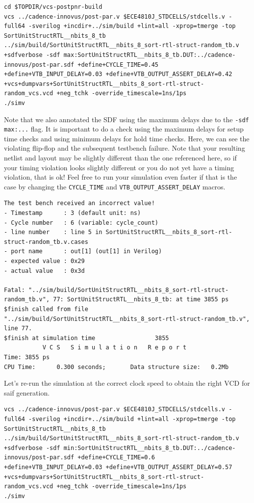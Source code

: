 \documentclass[a4paper,12pt,twoside]{article}
\begin{document}
\begin{verbatim}
cd $TOPDIR/vcs-postpnr-build
vcs ../cadence-innovus/post-par.v $ECE4810J_STDCELLS/stdcells.v -full64 -sverilog +incdir+../sim/build +lint=all -xprop=tmerge -top SortUnitStructRTL__nbits_8_tb ../sim/build/SortUnitStructRTL__nbits_8_sort-rtl-struct-random_tb.v +sdfverbose -sdf max:SortUnitStructRTL__nbits_8_tb.DUT:../cadence-innovus/post-par.sdf +define+CYCLE_TIME=0.45 +define+VTB_INPUT_DELAY=0.03 +define+VTB_OUTPUT_ASSERT_DELAY=0.42 +vcs+dumpvars+SortUnitStructRTL__nbits_8_sort-rtl-struct-random_vcs.vcd +neg_tchk -override_timescale=1ns/1ps
./simv
\end{verbatim}
Note that we also annotated the SDF using the maximum delays due to the \texttt{-sdf max:...} flag. It is important to do a check using the maximum delays for setup time checks and using minimum delays for hold time checks. Here, we can see the violating flip-flop and the subsequent testbench failure. Note that your resulting netlist and layout may be slightly different than the one referenced here, so if your timing violation looks slightly different or you do not yet have a timing violation, that is ok! Feel free to run your simulation even faster if that is the case by changing the \texttt{CYCLE\_TIME} and \texttt{VTB\_OUTPUT\_ASSERT\_DELAY} macros.
\begin{verbatim}
The test bench received an incorrect value!
- Timestamp      : 3 (default unit: ns)
- Cycle number   : 6 (variable: cycle_count)
- line number    : line 5 in SortUnitStructRTL__nbits_8_sort-rtl-struct-random_tb.v.cases
- port name      : out[1] (out[1] in Verilog)
- expected value : 0x29
- actual value   : 0x3d

Fatal: "../sim/build/SortUnitStructRTL__nbits_8_sort-rtl-struct-random_tb.v", 77: SortUnitStructRTL__nbits_8_tb: at time 3855 ps
$finish called from file "../sim/build/SortUnitStructRTL__nbits_8_sort-rtl-struct-random_tb.v", line 77.
$finish at simulation time                 3855
           V C S   S i m u l a t i o n   R e p o r t
Time: 3855 ps
CPU Time:      0.300 seconds;       Data structure size:   0.2Mb
\end{verbatim}
Let’s re-run the simulation at the correct clock speed to obtain the right VCD for saif generation.
\begin{verbatim}
vcs ../cadence-innovus/post-par.v $ECE4810J_STDCELLS/stdcells.v -full64 -sverilog +incdir+../sim/build +lint=all -xprop=tmerge -top SortUnitStructRTL__nbits_8_tb ../sim/build/SortUnitStructRTL__nbits_8_sort-rtl-struct-random_tb.v +sdfverbose -sdf min:SortUnitStructRTL__nbits_8_tb.DUT:../cadence-innovus/post-par.sdf +define+CYCLE_TIME=0.6 +define+VTB_INPUT_DELAY=0.03 +define+VTB_OUTPUT_ASSERT_DELAY=0.57 +vcs+dumpvars+SortUnitStructRTL__nbits_8_sort-rtl-struct-random_vcs.vcd +neg_tchk -override_timescale=1ns/1ps
./simv
\end{verbatim}
\end{document}
